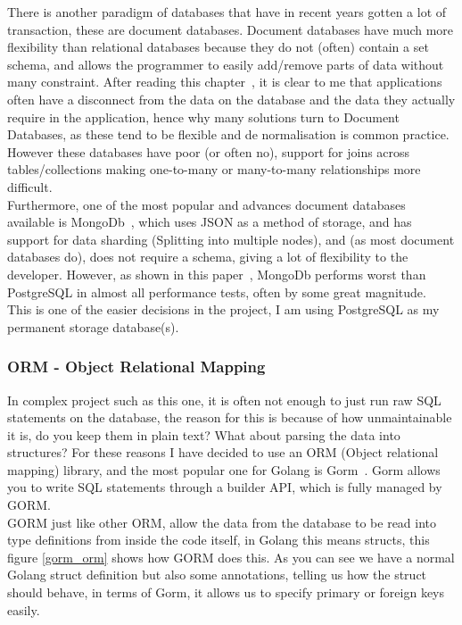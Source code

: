 \documentclass[titlepage]{article}
\begin{document}
There is another paradigm of databases that have in recent years gotten a lot of transaction, these are document databases. Document databases have much more flexibility than relational databases because they do not (often) contain a set schema, and allows the programmer to easily add/remove parts of data without many constraint. After reading this chapter~\cite{relational_vs_document}, it is clear to me that applications often have a disconnect from the data on the database and the data they actually require in the application, hence why many solutions turn to Document Databases, as these tend to be flexible and de normalisation is common practice. However these databases have poor (or often no), support for joins across tables/collections making one-to-many or many-to-many relationships more difficult. \\

Furthermore, one of the most popular and advances document databases available is MongoDb~\cite{mongodb}, which uses JSON as a method of storage, and has support for data sharding (Splitting into multiple nodes), and (as most document databases do), does not require a schema, giving a lot of flexibility to the developer. However, as shown in this paper~\cite{mongo_vs_postgres}, MongoDb performs worst than PostgreSQL in almost all performance tests, often by some great magnitude. \\

This is one of the easier decisions in the project, I am using PostgreSQL as my permanent storage database(s).

\subsubsection{ORM - Object Relational Mapping}
\label{orm}
In complex project such as this one, it is often not enough to just run raw SQL statements on the database, the reason for this is because of how unmaintainable it is, do you keep them in plain text? What about parsing the data into structures? For these reasons I have decided to use an ORM (Object relational mapping) library, and the most popular one for Golang is Gorm~\cite{gorm}. Gorm allows you to write SQL statements through a builder API, which is fully managed by GORM. \\

GORM just like other ORM, allow the data from the database to be read into type definitions from inside the code itself, in Golang this means structs, this figure \ref{gorm_orm} shows how GORM does this. As you can see we have a normal Golang struct definition but also some annotations, telling us how the struct should behave, in terms of Gorm, it allows us to specify primary or foreign keys easily.
\end{document}

